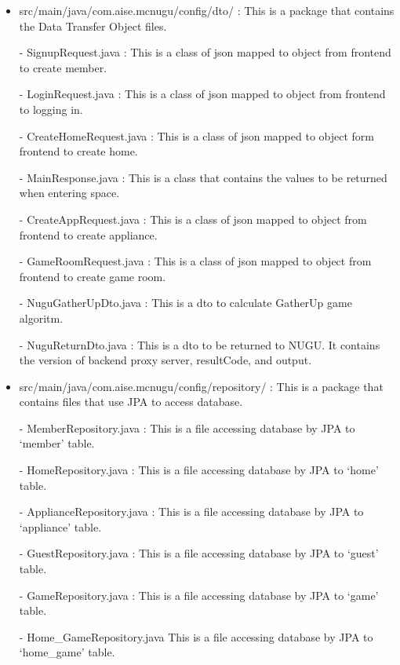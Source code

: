 \documentclass[conference]{IEEEtran}
\begin{document}
\begin{itemize}
                \item src/main/java/com.aise.mcnugu/config/dto/ : This is a package that contains the Data Transfer Object files.
                    \item[-] SignupRequest.java : This is a class of json mapped to object from frontend to create member.
                    \item[-] LoginRequest.java : This is a class of json mapped to object from frontend to logging in.
                    \item[-] CreateHomeRequest.java : This is a class of json mapped to object form frontend to create home.
                    \item[-] MainResponse.java : This is a class that contains the values to be returned when entering space.
                    \item[-] CreateAppRequest.java : This is a class of json mapped to object from frontend to create appliance.
                    \item[-] GameRoomRequest.java : This is a class of json mapped to object from frontend to create game room.
                    \item[-] NuguGatherUpDto.java : This is a dto to calculate GatherUp game algoritm.
                    \item[-] NuguReturnDto.java : This is a dto to be returned to NUGU. It contains the version of backend proxy server, resultCode, and output.
                \vspace{3mm}

                \item src/main/java/com.aise.mcnugu/config/repository/ : This is a package that contains files that use JPA to access database.
                    \item[-] MemberRepository.java : This is a file accessing database by JPA to ‘member’ table.
                    \item[-] HomeRepository.java : This is a file accessing database by JPA to ‘home’ table.
                    \item[-] ApplianceRepository.java : This is a file accessing database by JPA to ‘appliance’ table.
                    \item[-] GuestRepository.java : This is a file accessing database by JPA to ‘guest’ table.
                    \item[-] GameRepository.java : This is a file accessing database by JPA to ‘game’ table.
                    \item[-] Home\_GameRepository.java This is a file accessing database by JPA to ‘home\_game’ table.
                \vspace{3mm}


\end{itemize}
\end{document}
